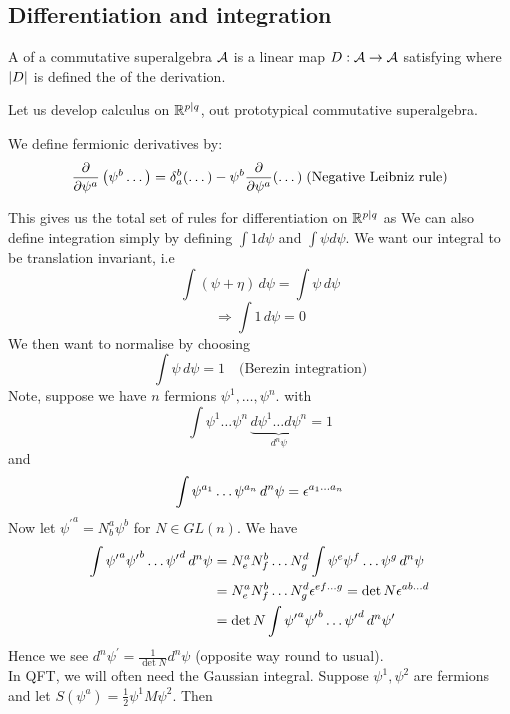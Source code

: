 \documentclass{article}
\begin{document}
\subsection{Differentiation and integration}

\begin{definition}
	A  of a commutative superalgebra $\mathcal{A}$ is a linear map $D : \mathcal{A} \to \mathcal{A}$ satisfying 
where $\left\lvert D \right\rvert$ is defined the  of the derivation. 
\end{definition}
Let us develop calculus on $\mathbb{R}^{p|q}$, out prototypical commutative superalgebra.
\begin{definition}
We define fermionic derivatives by:
\[
\frac{\partial}{\partial\psi^a}\left(\psi^b \dots \right) = \delta^b_a ( \dots) - \psi^b \frac{\partial}{\partial\psi^a} (\dots) \; \text{(Negative Leibniz rule)}
\]
\end{definition}
This gives us the total set of rules for differentiation on $\mathbb{R}^{p|q}$ as 
We can also define integration simply by defining $\int 1 d\psi$ and $\int \psi d\psi$. We want our integral to be translation invariant, i.e 
\[
\int (\psi + \eta) \, d\psi = \int \psi \, d\psi
\]
\[
\Rightarrow \int 1 \, d\psi = 0 
\]
We then want to normalise by choosing 
\[
\int \psi \, d\psi = 1 \quad \text{(Berezin integration)}
\]
Note, suppose we have $n$ fermions $\psi^1, \dots, \psi^n$. with 
\[
\int \psi^1 \dots \psi^n \, \underbrace{ d\psi^1 \dots d\psi^n}_{d^n \psi} = 1 
\]
and 
\[
\int \psi^{a_1} \dots \psi^{a_n} \, d^n \psi = \epsilon^{a_1 \dots a_n}
\]
Now let ${\psi^\prime}^a=N^a_b \psi^b$ for $N\in GL(n)$. We have 
\begin{align*}
    \int {\psi^\prime}^a {\psi^\prime}^b \dots {\psi^\prime}^d \, d^n \psi &= N^a_e N^b_f \dots N^d_g \int \psi^e \psi^f \dots \psi^g \, d^n \psi \\
    &= N^a_e N^b_f \dots N^d_g \epsilon^{ef\dots g} = \det N \epsilon^{ab\dots d} \\
    &= \det N \int {\psi^\prime}^a {\psi^\prime}^b \dots {\psi^\prime}^d \, d^n \psi^\prime 
\end{align*}
Hence we see $d^n \psi^\prime = \frac{1}{\det N} d^n \psi$ (opposite way round to usual). \\
In QFT, we will often need the Gaussian integral. Suppose $\psi^1, \psi^2$ are fermions and let $S(\psi^a) = \frac{1}{2}\psi^1 M \psi^2$. Then 
\end{document}
